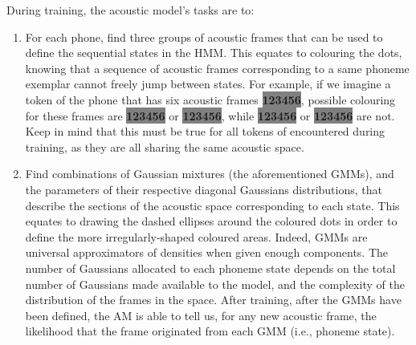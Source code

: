 During training, the acoustic model's tasks are to:
\begin{enumerate}
\item For each phone, find three groups of acoustic frames that can be used to define the sequential states in the HMM. This equates to colouring the dots, knowing that a sequence of acoustic frames corresponding to a same phoneme exemplar cannot freely jump between states. For example, if we imagine a token of the phone \textipa{[p]} that has six acoustic frames \colorbox{gray}{\textbf{123456}}, possible colouring for these frames are \colorbox{gray}{\textbf{{\color{yellow}123}{\color{blue}45}{\color{framboise}6}}} or \colorbox{gray}{\textbf{{\color{yellow}1}{\color{blue}23}{\color{framboise}456}}}, while \colorbox{gray}{\textbf{{\color{framboise}12}{\color{yellow}3}{\color{blue}45}{\color{yellow}6}}} or \colorbox{gray}{\textbf{{\color{yellow}1}{\color{blue}23}{\color{framboise}45}{\color{yellow}6}}} are not. Keep in mind that this must be true for all tokens of \textipa{[p]} encountered during training, as they are all sharing the same acoustic space.   
\item Find combinations of Gaussian mixtures (the aforementioned GMMs), and the parameters of their respective diagonal Gaussians distributions, that describe the sections of the acoustic space corresponding to each state. This equates to drawing the dashed ellipses around the coloured dots in order to define the more irregularly-shaped coloured areas. Indeed, GMMs are universal approximators of densities when given enough components. The number of Gaussians allocated to each phoneme state depends on the total number of Gaussians made available to the model, and the complexity of the distribution of the frames in the space. After training, after the GMMs have been defined, the AM is able to tell us, for any new acoustic frame, the likelihood that the frame originated from each GMM (i.e., phoneme state).
\end{enumerate}   

